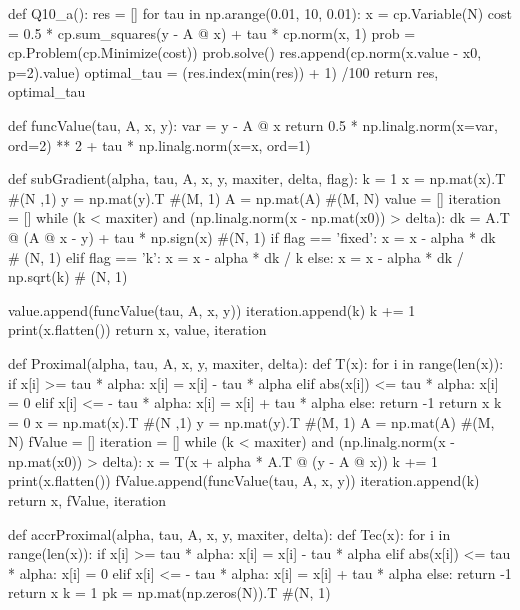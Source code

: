 \documentclass[12pt, a4 paper]{article}
\begin{document}
\begin{framed}
\begin{python}
def Q10_a():
    res = []
    for tau in np.arange(0.01, 10, 0.01):
        x = cp.Variable(N)
        cost = 0.5 * cp.sum_squares(y - A @ x) + tau * cp.norm(x, 1)
        prob = cp.Problem(cp.Minimize(cost))
        prob.solve()
        res.append(cp.norm(x.value - x0, p=2).value)
    optimal_tau = (res.index(min(res)) + 1) /100
    return res, optimal_tau

def funcValue(tau, A, x, y):
    var = y - A @ x
    return 0.5 * np.linalg.norm(x=var, ord=2) ** 2 + tau * np.linalg.norm(x=x, ord=1)

def subGradient(alpha, tau, A, x, y, maxiter, delta, flag):
    k = 1
    x = np.mat(x).T #(N ,1)
    y = np.mat(y).T #(M, 1)
    A = np.mat(A) #(M, N)
    value = []
    iteration = []
    while (k < maxiter) and (np.linalg.norm(x - np.mat(x0)) > delta):
        dk = A.T @ (A @ x - y) + tau * np.sign(x) #(N, 1)
        if flag == 'fixed':
            x = x - alpha * dk # (N, 1)
        elif flag == 'k':
            x = x - alpha * dk / k
        else:
            x = x - alpha * dk / np.sqrt(k) # (N, 1)

        value.append(funcValue(tau, A, x, y))
        iteration.append(k)
        k += 1
        print(x.flatten())
    return x, value, iteration

def Proximal(alpha, tau, A, x, y, maxiter, delta):
    def T(x):
        for i in range(len(x)):
            if x[i] >= tau * alpha:
                x[i] = x[i] - tau * alpha
            elif abs(x[i]) <= tau * alpha:
                x[i] = 0
            elif x[i] <= - tau * alpha:
                x[i] = x[i] + tau * alpha
            else:
                return -1
        return x
    k = 0
    x = np.mat(x).T #(N ,1)
    y = np.mat(y).T #(M, 1)
    A = np.mat(A) #(M, N)
    fValue = []
    iteration = []
    while (k < maxiter) and (np.linalg.norm(x - np.mat(x0)) > delta):
        x = T(x + alpha * A.T @ (y - A @ x))
        k += 1
        print(x.flatten())
        fValue.append(funcValue(tau, A, x, y))
        iteration.append(k)
    return x, fValue, iteration


def accrProximal(alpha, tau, A, x, y, maxiter, delta):
    def Tec(x):
        for i in range(len(x)):
            if x[i] >= tau * alpha:
                x[i] = x[i] - tau * alpha
            elif abs(x[i]) <= tau * alpha:
                x[i] = 0
            elif x[i] <= - tau * alpha:
                x[i] = x[i] + tau * alpha
            else:
                return -1
        return x
    k = 1
    pk = np.mat(np.zeros(N)).T #(N, 1)


\end{python}
\end{framed}
\end{document}
